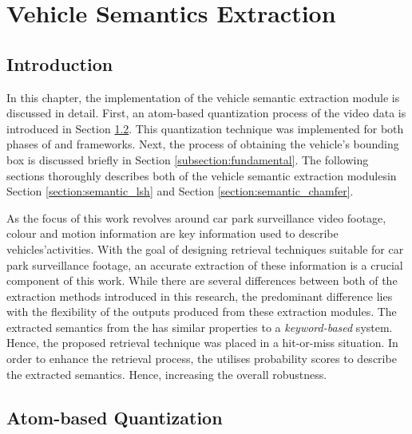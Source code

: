 \chapter{Vehicle Semantics Extraction}

\label{section:semanticsextraction}


\section{Introduction}

In this chapter, the implementation of the vehicle semantic extraction module is discussed in detail.
First, an atom-based quantization process of the video data is introduced in Section \ref{section:atoms}. This quantization technique was implemented for both phases of \versionOneExt and \versionTwoExt frameworks. Next, the process of obtaining the vehicle's bounding box is discussed briefly in Section \ref{subsection:fundamental}.
The following sections thoroughly describes both of the vehicle semantic extraction modulesin Section \ref{section:semantic_lsh} and Section \ref{section:semantic_chamfer}.


As the focus of this work revolves around car park surveillance video footage, colour and motion information are key information used to describe vehicles'activities. With the goal of designing retrieval techniques suitable for car park surveillance footage, an accurate extraction of these information is a crucial component of this work.
While there are several differences between both of the extraction methods introduced in this research, the predominant difference lies with the flexibility of the outputs produced from these extraction modules.
The extracted semantics from the \versionOneExt has similar properties to a \textit{keyword-based} system. Hence, the proposed retrieval technique was placed in a hit-or-miss situation. In order to enhance the retrieval process, the \versionTwoExt utilises probability scores to describe the extracted semantics. Hence, increasing the overall robustness.



\section{Atom-based Quantization}
\label{section:atoms}

